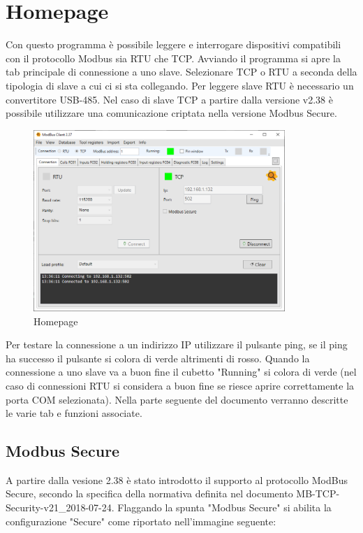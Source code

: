 
\chapter{Homepage}

Con questo programma è possibile leggere e interrogare dispositivi compatibili 
con il protocollo Modbus sia RTU che TCP.
Avviando il programma si apre la tab principale di connessione a uno slave. Selezionare TCP
o RTU a seconda della tipologia di slave a cui ci si sta collegando. 
Per leggere slave RTU è necessario un convertitore USB-485. 
Nel caso di slave TCP a partire dalla versione v2.38
è possibile utilizzare una comunicazione criptata nella versione Modbus Secure.

\begin{figure}[H]
\centering
\includegraphics[width=0.85\textwidth]{../Img/Modbus_Client_Home_00.PNG}
\caption[Homepage]{Homepage}
\end{figure}

Per testare la connessione a un indirizzo IP utilizzare il pulsante ping,
se il ping ha successo il pulsante si colora di verde altrimenti di rosso.
Quando la connessione a uno slave va a buon fine il cubetto "Running" si colora
di verde (nel caso di connessioni RTU si considera a buon fine se riesce 
aprire correttamente la porta COM selezionata).
Nella parte seguente del documento verranno descritte le varie tab e funzioni associate.

\newpage
\section{Modbus Secure}

A partire dalla vesione 2.38 è stato introdotto il supporto
al protocollo ModBus Secure, secondo la specifica della normativa
definita nel documento MB-TCP-Security-v21\_2018-07-24.
Flaggando la spunta "Modbus Secure" si abilita la configurazione "Secure" 
come riportato nell'immagine
seguente:

